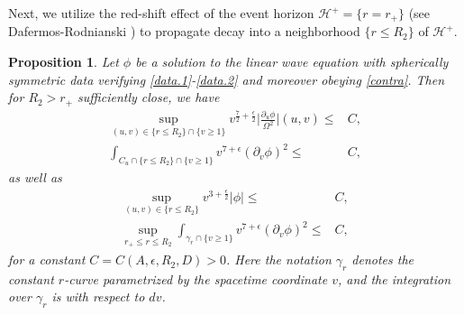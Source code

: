\documentclass[12 pt, reqno]{amsart}
\newtheorem{proposition}[theorem]{Proposition}
\theoremstyle{definition}
\theoremstyle{remark}
\numberwithin{equation}{section}
\newcommand{\abs}[1]{\vert#1\vert}
\newcommand{\set}[1]{\{#1\}}
\newcommand{\ep}{\epsilon}
\newcommand{\ud}{d}
\newcommand{\rd}{\partial}
\newcommand{\0}{\emptyset}
\newcommand{\gmm}{\gamma}
\newcommand{\eps}{\epsilon}
\newcommand{\Omg}{\Omega}
\newcommand{\calH}{\mathcal H}
\newcommand{\EH}{\calH^{+}}
\begin{document}
Next, we utilize the red-shift effect of the event horizon $\EH = \set{r = r_{+}}$ (see Dafermos-Rodnianski \cite{DRPL}) to propagate decay into a neighborhood $\set{r \leq R_{2}}$ of $\EH$.
%
% 

\begin{proposition}\label{prop:red-shift}
Let $\phi$ be a solution to the linear wave equation with spherically symmetric data verifying \eqref{data.1}-\eqref{data.2} and moreover obeying \eqref{contra}. Then for $R_{2} > r_{+}$ sufficiently close, we have
\begin{align} 
\sup_{(u, v) \in \set{r \leq R_{2}} \cap \set{v \geq 1}} v^{\frac{7}{2}+\frac{\eps}{2}}\abs{\frac{\rd_{u} \phi}{\Omg^{2}}}(u,v)
	\leq& C,  \label{eq:red-shift:1} \\
\int_{C_{u} \cap \set{r \leq R_{2}} \cap \set{v \geq 1}} v^{7+\eps} (\rd_{v} \phi)^{2} \leq& C, \label{eq:red-shift:2}
\end{align}
as well as
\begin{align} 
	\sup_{(u, v) \in \set{r \leq R_{2}}} v^{3+\frac{\eps}{2}} \abs{\phi} \leq & C, \label{eq:red-shift:r=R2:phi} \\
	\sup_{r_+\leq r\leq R_2}\int_{\gmm_{r} \cap \set{v \geq 1}} v^{7+\eps} (\rd_{v} \phi)^{2}  \leq & C, \label{eq:red-shift:r=R2:dvphi}
\end{align}
for a constant $C = C(A, \eps, R_{2},D) > 0$. Here the notation $\gmm_{r}$ denotes the constant $r$-curve parametrized by the spacetime coordinate $v$, and the integration over $\gmm_{r}$ is with respect to $\ud v$.
\end{proposition}
\end{document}
